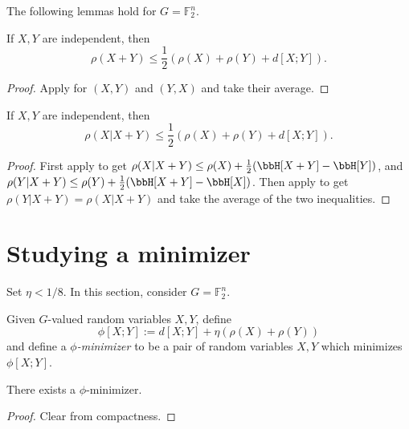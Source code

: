 The following lemmas hold for $G=\mathbb{F}_2^n$.

\begin{lemma}\label{rho-sums-sym}  If $X,Y$ are independent, then
  $$ \rho(X+Y) \leq \frac{1}{2}(\rho(X)+\rho(Y) + d[X;Y]).$$
\end{lemma}
\begin{proof}
Apply  for $(X,Y)$ and $(Y,X)$ and take their average.
\end{proof}

\begin{lemma}\label{rho-cond-sym}
  If $X,Y$ are independent, then
  $$ \rho(X | X+Y) \leq \frac{1}{2}(\rho(X)+\rho(Y) + d[X;Y]).$$
\end{lemma}
\begin{proof}
  First apply  to get $\rho(X|X+Y)\le \rho(X) + \frac{1}{2}(\bbH[X+Y]-\bbH[Y])$, and $\rho(Y|X+Y)\le \rho(Y)+\frac{1}{2}(\bbH[X+Y]-\bbH[X])$. Then apply  to get $\rho(Y|X+Y)=\rho(X|X+Y)$ and take the average of the two inequalities.
\end{proof}

\section{Studying a minimizer}

Set $\eta < 1/8$. In this section, consider $G=\mathbb{F}_2^n$.

\begin{definition}\label{phi-min-def}  Given $G$-valued random variables $X,Y$, define
$$ \phi[X;Y] := d[X;Y] + \eta(\rho(X) + \rho(Y))$$
and define a \emph{$\phi$-minimizer} to be a pair of random variables $X,Y$ which minimizes $\phi[X;Y]$.
\end{definition}

\begin{lemma}\label{phi-min-exist}  There exists a $\phi$-minimizer.
\end{lemma}

\begin{proof} Clear from compactness.
\end{proof}

